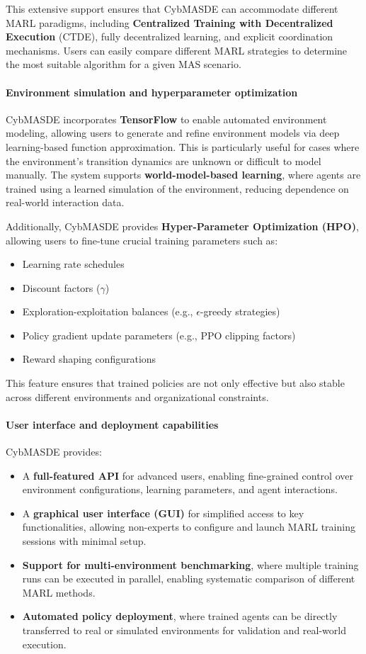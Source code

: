 \documentclass[pdflatex,sn-mathphys-num]{sn-jnl}%
\theoremstyle{thmstyleone}%
\theoremstyle{thmstyletwo}%
\theoremstyle{thmstylethree}%
\begin{document}
This extensive support ensures that CybMASDE can accommodate different MARL paradigms, including \textbf{Centralized Training with Decentralized Execution} (CTDE), fully decentralized learning, and explicit coordination mechanisms. Users can easily compare different MARL strategies to determine the most suitable algorithm for a given MAS scenario.

\paragraph{Environment simulation and hyperparameter optimization} 
CybMASDE incorporates \textbf{TensorFlow} to enable automated environment modeling, allowing users to generate and refine environment models via deep learning-based function approximation. This is particularly useful for cases where the environment's transition dynamics are unknown or difficult to model manually. The system supports \textbf{world-model-based learning}, where agents are trained using a learned simulation of the environment, reducing dependence on real-world interaction data.

Additionally, CybMASDE provides \textbf{Hyper-Parameter Optimization (HPO)}, allowing users to fine-tune crucial training parameters such as:
\begin{itemize}
    \item Learning rate schedules
    \item Discount factors ($\gamma$)
    \item Exploration-exploitation balances (e.g., $\epsilon$-greedy strategies)
    \item Policy gradient update parameters (e.g., PPO clipping factors)
    \item Reward shaping configurations
\end{itemize}

This feature ensures that trained policies are not only effective but also stable across different environments and organizational constraints.

\paragraph{User interface and deployment capabilities} 
CybMASDE provides:
\begin{itemize}
    \item A \textbf{full-featured API} for advanced users, enabling fine-grained control over environment configurations, learning parameters, and agent interactions.
    \item A \textbf{graphical user interface (GUI)} for simplified access to key functionalities, allowing non-experts to configure and launch MARL training sessions with minimal setup.
    \item \textbf{Support for multi-environment benchmarking}, where multiple training runs can be executed in parallel, enabling systematic comparison of different MARL methods.
    \item \textbf{Automated policy deployment}, where trained agents can be directly transferred to real or simulated environments for validation and real-world execution.
\end{itemize}
\end{document}
